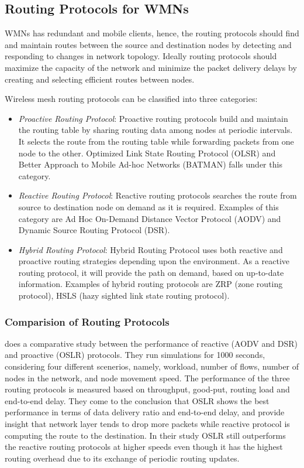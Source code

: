 \subsection{Routing Protocols for WMNs}

WMNs has redundant and mobile clients, hence, the routing protocols should find and maintain routes between the source and destination nodes by detecting and responding to changes in network topology. Ideally routing protocols should maximize the capacity of the network and minimize the packet delivery delays by creating and selecting efficient routes between nodes.

Wireless mesh routing protocols can be classified into three categories:

\begin{itemize}
	\item \textit{Proactive Routing Protocol}: Proactive routing protocols build and maintain the routing table by sharing routing data among nodes at periodic intervals. It selects the route from the routing table while forwarding packets from one node to the other. Optimized Link State Routing Protocol (OLSR) and Better Approach to Mobile Ad-hoc Networks (BATMAN) falls under this category.
	\item \textit{Reactive Routing Protocol}:  Reactive routing protocols searches the route from source to destination node on demand as it is required. Examples of this category are Ad Hoc On-Demand Distance Vector Protocol (AODV) and Dynamic Source Routing Protocol (DSR).
	\item \textit{Hybrid Routing Protocol}: Hybrid Routing Protocol uses both reactive and proactive routing strategies depending upon the environment. As a reactive routing protocol, it will provide the path on demand, based on up-to-date information. Examples of hybrid routing protocols are ZRP (zone routing protocol), HSLS (hazy sighted link state routing protocol).
\end{itemize}

\subsubsection{Comparision of Routing Protocols}

 does a comparative study between the performance of reactive (AODV and DSR) and proactive (OSLR) protocols. They run simulations for 1000 seconds, considering four different scenerios, namely, workload, number of flows, number of nodes in the network, and node movement speed. The performance of the three routing protocols is measured based on throughput, good-put, routing load and end-to-end delay. They come to the conclusion that OSLR shows the best performance in terms of data delivery ratio and end-to-end delay, and provide insight that network layer tends to drop more packets while reactive protocol is computing the route to the destination. In their study OSLR still outperforms the reactive routing protocols at higher speeds even though it has the highest routing overhead due to its exchange of periodic routing updates.

